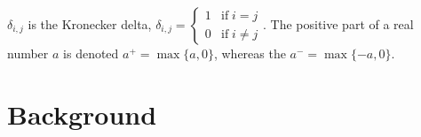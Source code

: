 \documentclass{article}
\begin{document}
$\delta_{i,j}$ is the Kronecker delta, $\delta_{i, j} = \begin{cases} 1 & \textrm{if} \; i = j \\ 0 & \textrm{if} \; i \ne j \end{cases}$.
The positive part of a real number $a$ is denoted $a^+ = \max\{a,0\}$, whereas the $a^-=\max\{-a,0\}$.



\section{Background}
%
\end{document}
